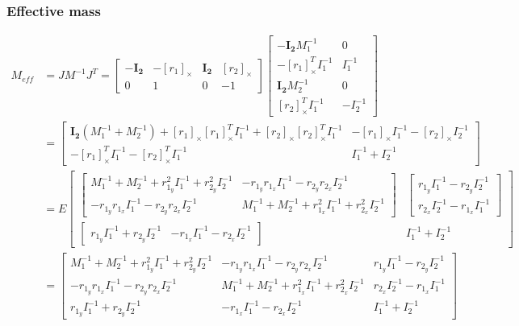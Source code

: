 \documentclass{article}
\begin{document}
	\subsubsection{Effective mass}
		\begin{align*}		
		M_{eff} &= JM^{-1}J^T =
					\begin{bmatrix}
						-\boldsymbol{I_2}	& -[r_1]_\times	& \boldsymbol{I_2}	& [r_2]_\times\\
						0					& 1			 	& 0					& -1
					\end{bmatrix}
					\begin{bmatrix}
						-\boldsymbol{I_2}M_1^{-1}	& 0\\
						-[r_1]_\times^TI_1^{-1}		& I_1^{-1}\\
						\boldsymbol{I_2}M_2^{-1}	& 0\\
						[r_2]_\times^TI_1^{-1}		& -I_2^{-1}
					\end{bmatrix}\\
				&=
\begin{bmatrix}
\boldsymbol{I_2}(M_1^{-1} + M_2^{-1}) + [r_1]_\times[r_1]_\times^TI_1^{-1} + [r_2]_\times[r_2]_\times^TI_1^{-1} & -[r_1]_\times I_1^{-1} - [r_2]_\times I_2^{-1}\\
-[r_1]_\times^TI_1^{-1} - [r_2]_\times^TI_1^{-1} & I_1^{-1} + I_2^{-1}
\end{bmatrix}\\
				&= E
					\begin{bmatrix}
						\begin{bmatrix}
							M_1^{-1} + M_2^{-1} + r_{1_y}^2I_1^{-1} + r_{2_y}^2I_2^{-1}	& -r_{1_y}r_{1_x}I_1^{-1} - r_{2_y}r_{2_x}I_2^{-1}\\
							-r_{1_y}r_{1_x}I_1^{-1} - r_{2_y}r_{2_x}I_2^{-1}			&  M_1^{-1} + M_2^{-1} + r_{1_x}^2I_1^{-1} + r_{2_x}^2I_2^{-1}
						\end{bmatrix}
						&
						\begin{bmatrix}
							r_{1_y}I_1^{-1} - r_{2_y}I_2^{-1}\\
							r_{2_x}I_2^{-1} - r_{1_x}I_1^{-1}
						\end{bmatrix}\\
						\begin{bmatrix} 
							r_{1_y}I_1^{-1} + r_{2_y}I_2^{-1} & -r_{1_x}I_1^{-1} - r_{2_x}I_2^{-1}
						\end{bmatrix}
						&
						I_1^{-1} + I_2^{-1}
					\end{bmatrix}\\
				&=
					\begin{bmatrix}
						M_1^{-1} + M_2^{-1} + r_{1_y}^2I_1^{-1} + r_{2_y}^2I_2^{-1} & -r_{1_y}r_{1_x}I_1^{-1} - r_{2_y}r_{2_x}I_2^{-1}				& r_{1_y}I_1^{-1} - r_{2_y}I_2^{-1}\\
						-r_{1_y}r_{1_x}I_1^{-1} - r_{2_y}r_{2_x}I_2^{-1}			& M_1^{-1} + M_2^{-1} + r_{1_x}^2I_1^{-1} + r_{2_x}^2I_2^{-1}	& r_{2_x}I_2^{-1} - r_{1_x}I_1^{-1}\\
						r_{1_y}I_1^{-1} + r_{2_y}I_2^{-1}							& -r_{1_x}I_1^{-1} - r_{2_x}I_2^{-1}							& I_1^{-1} + I_2^{-1}
					\end{bmatrix}
	\end{align*}
\end{document}
